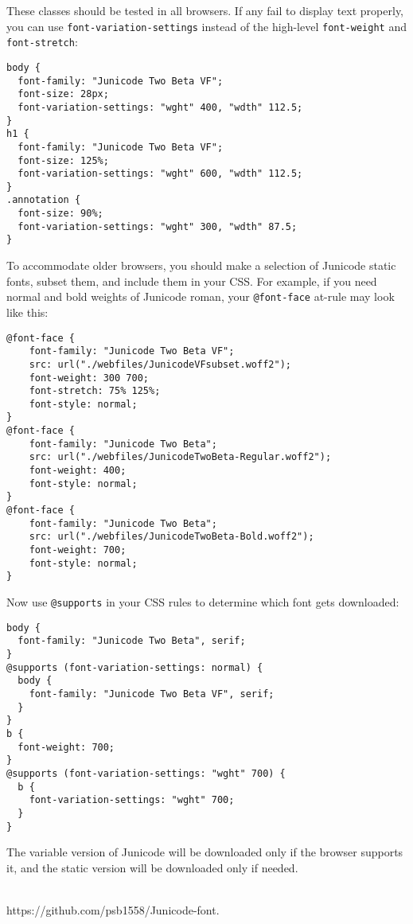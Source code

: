 \documentclass[12pt,letterpaper,openany]{book}
\newcounter{Feature}
\begin{document}
\normalsize\noindent These classes should be tested in all browsers. If any fail to
display text properly, you can use \texttt{font-variation-settings}
instead of the high-level \texttt{font-weight} and \texttt{font-stretch}:

\small\begin{verbatim}
body {
  font-family: "Junicode Two Beta VF";
  font-size: 28px;
  font-variation-settings: "wght" 400, "wdth" 112.5;
}
h1 {
  font-family: "Junicode Two Beta VF";
  font-size: 125%;
  font-variation-settings: "wght" 600, "wdth" 112.5;
}
.annotation {
  font-size: 90%;
  font-variation-settings: "wght" 300, "wdth" 87.5;
}
\end{verbatim}

\normalsize\noindent To accommodate older browsers, you should make a selection of
Junicode static fonts, subset them, and include them in your CSS. For example,
if you need normal and bold weights of Junicode roman, your
\texttt{@font-face} at-rule may look like this:

\small\begin{verbatim}
@font-face {
    font-family: "Junicode Two Beta VF";
    src: url("./webfiles/JunicodeVFsubset.woff2");
    font-weight: 300 700;
    font-stretch: 75% 125%;
    font-style: normal;
}
@font-face {
    font-family: "Junicode Two Beta";
    src: url("./webfiles/JunicodeTwoBeta-Regular.woff2");
    font-weight: 400;
    font-style: normal;
}
@font-face {
    font-family: "Junicode Two Beta";
    src: url("./webfiles/JunicodeTwoBeta-Bold.woff2");
    font-weight: 700;
    font-style: normal;
}
\end{verbatim}

\normalsize\noindent Now use \texttt{@supports} in your CSS rules to determine which
font gets downloaded:

\small\begin{verbatim}
body {
  font-family: "Junicode Two Beta", serif;
}
@supports (font-variation-settings: normal) {
  body {
    font-family: "Junicode Two Beta VF", serif;
  }
}
b {
  font-weight: 700;
}
@supports (font-variation-settings: "wght" 700) {
  b {
    font-variation-settings: "wght" 700;
  }
}
\end{verbatim}

\normalsize\noindent The variable version of Junicode will be downloaded only if
the browser supports it, and the static version will be downloaded only if
needed.


\vspace*{\fill}
\begin{center}
{}\\
{\color{BrickRed}https://github.com/psb1558/Junicode-font.}
\end{center}
\end{document}

